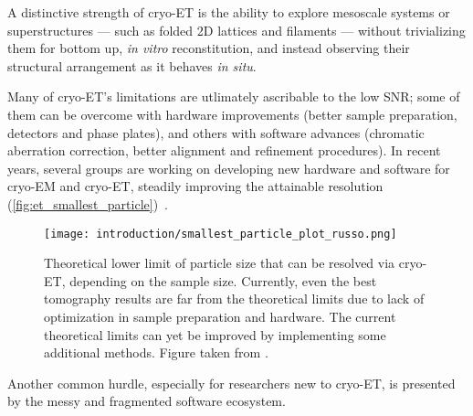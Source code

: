 A distinctive strength of cryo-ET is the ability to explore mesoscale systems or superstructures --- such as folded 2D lattices and filaments --- without trivializing them for bottom up, \textit{in vitro} reconstitution, and instead observing their structural arrangement as it behaves \textit{in situ}.

Many of cryo-ET's limitations are utlimately ascribable to the low SNR; some of them can be overcome with hardware improvements (better sample preparation, detectors and phase plates), and others with software advances (chromatic aberration correction, better alignment and refinement procedures).
In recent years, several groups are working on developing new hardware and software for cryo-EM and cryo-ET, steadily improving the attainable resolution (\autoref{fig:et_smallest_particle})~\cite{russoCryomicroscopySituWhat2022}.

\begin{figure}[ht]
    \centering
    \texttt{[image: introduction/smallest\_particle\_plot\_russo.png]}
    \caption[Particle size limit in cryo-ET]{Theoretical lower limit of particle size that can be resolved via cryo-ET, depending on the sample size. Currently, even the best tomography results are far from the theoretical limits due to lack of optimization in sample preparation and hardware. The current theoretical limits can yet be improved by implementing some additional methods. Figure taken from \citet{russoElectronCryomicroscopeHardware2023}.}
    \label{fig:et_smallest_particle}
\end{figure}

Another common hurdle, especially for researchers new to cryo-ET, is presented by the messy and fragmented software ecosystem.

